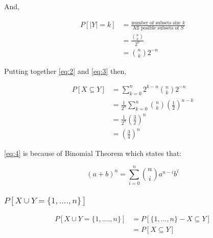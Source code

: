 \documentclass[12pt, a4paper]{article}
\begin{document}
And,

\begin{subequations}
  \begin{align}
    P[|Y| = k] &= \frac{\text{number of subsets size }k}{\text{All posible subsets of }S} \\
               &= \frac{\binom{n}{k}}{2^n} \\
               &= \binom{n}{k}{2^{-n}} \label{eq:3}
  \end{align}
\end{subequations}


Putting together \ref{eq:2} and \ref{eq:3} then,


\begin{subequations} 
  \begin{align}
    P[X \subseteq Y] &= \displaystyle\sum_{k=0}^{n} 2^{k-n}\binom{n}{k}{2^{-n}} \\
                     &= \frac{1}{2^n} \displaystyle\sum_{k=0}^{n} \binom{n}{k} \left(\frac{1}{2}\right)^{n-k} \label{eq:4} \\
                     &= \frac{1}{2^n}\left( \frac{3}{2} \right)^n \\
                     &= \left( \frac{3}{4} \right)^n \label{eq:5}
  \end{align}
\end{subequations}

\ref{eq:4} is because of Binomial Theorem which states that:


\begin{equation}
  (a + b)^n = \displaystyle\sum_{i=0}^{n} \binom{n}{i} {a^{n-i}}b^i
\end{equation}

\subsubsection{\(P[{X \cup Y} = \{1,....,n\}]\)}

\begin{subequations} 
  \begin{align}
    P[{X \cup Y} = \{1,....,n\}] &= P[{\{1,...,n\} - X} \subseteq Y] \label{eq:6} \\
    &= P[X \subseteq Y] \label{eq:7}
  \end{align}
\end{subequations}
\end{document}
